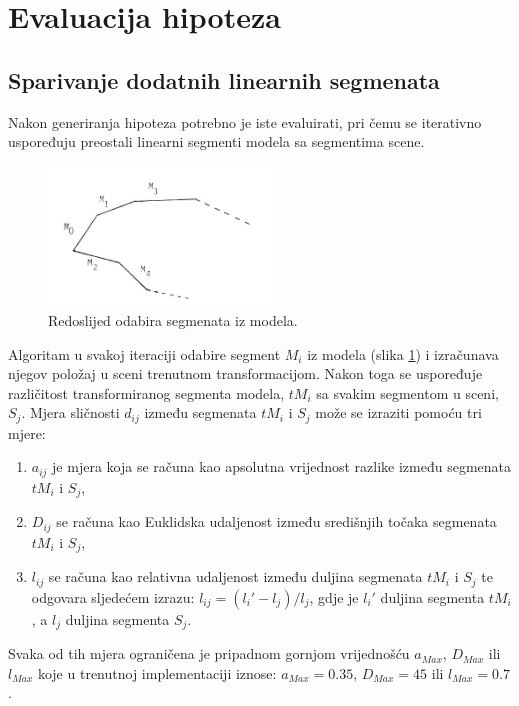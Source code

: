 \documentclass[lmodern, utf8, seminar, numeric]{fer}
\begin{document}
\section{Evaluacija hipoteza}
\subsection{Sparivanje dodatnih linearnih segmenata}
Nakon generiranja hipoteza potrebno je iste evaluirati, pri čemu se iterativno uspoređuju preostali linearni segmenti modela sa segmentima scene.

\begin{figure}[htb]
\begin{center}
\includegraphics[width=6cm]{resources/segmenti.png}
\end{center}
\caption{Redoslijed odabira segmenata iz modela.}
\label{fig:redoslijed_odabira}
\end{figure}

Algoritam u svakoj iteraciji odabire segment $M_i$ iz modela (slika
\ref{fig:redoslijed_odabira}) i izračunava njegov položaj u sceni trenutnom
transformacijom. Nakon toga se uspoređuje različitost transformiranog segmenta
modela, $tM_i$ sa svakim segmentom u sceni, $S_j$. Mjera sličnosti $d_{ij}$
između segmenata $tM_i$ i $S_j$ može se izraziti pomoću tri mjere:

\begin{enumerate}
  \item $a_{ij}$ je mjera koja se računa kao apsolutna vrijednost razlike između segmenata $tM_i$ i $S_j$,
  \item $D_{ij}$
se računa kao Euklidska udaljenost između središnjih točaka segmenata $tM_i$ i $S_j$,
  \item $l_{ij}$ se računa kao relativna udaljenost između duljina segmenata $tM_i$ i $S_j$ te odgovara sljedećem izrazu: $l_{ij}=(l_i'-l_j)/l_j$, gdje je $l_i'$ duljina segmenta $tM_i$, a $l_j$ duljina segmenta $S_j$.
\end{enumerate}

Svaka od tih mjera ograničena je pripadnom gornjom vrijednošću $a_{Max}$,
$D_{Max}$ ili $l_{Max}$ koje u trenutnoj implementaciji iznose: $a_{Max}=0.35$,
$D_{Max}=45$ ili $l_{Max}=0.7$.
\end{document}
